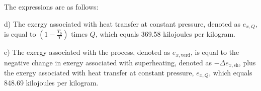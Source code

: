 The expressions are as follows:

d) The exergy associated with heat transfer at constant pressure, denoted as \( e_{x,Q} \), is equal to \( \left( 1 - \frac{T_0}{T} \right) \) times \( Q \), which equals 369.58 kilojoules per kilogram.

e) The exergy associated with the process, denoted as \( e_{x,\text{verd}} \), is equal to the negative change in exergy associated with superheating, denoted as \( - \Delta e_{x,\text{sh}} \), plus the exergy associated with heat transfer at constant pressure, \( e_{x,Q} \), which equals 848.69 kilojoules per kilogram.